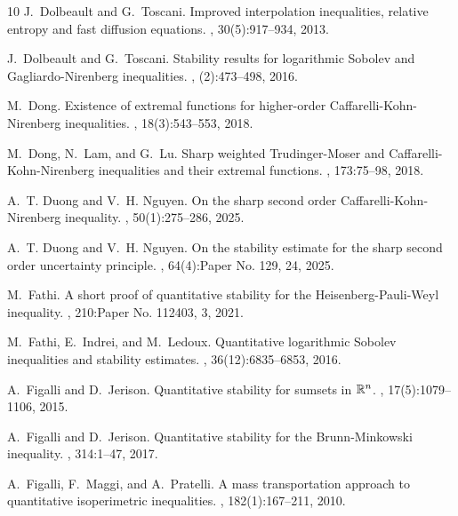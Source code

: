 \documentclass[a4paper,12pt]{article}
\theoremstyle{plain}
\theoremstyle{definition}
\theoremstyle{remark}
\numberwithin{equation}{section}
\begin{document}
\begin{thebibliography}{10}
J.~Dolbeault and G.~Toscani.
\newblock Improved interpolation inequalities, relative entropy and fast
  diffusion equations.
,
  30(5):917--934, 2013.

J.~Dolbeault and G.~Toscani.
\newblock Stability results for logarithmic {S}obolev and
  {G}agliardo-{N}irenberg inequalities.
, (2):473--498, 2016.

M.~Dong.
\newblock Existence of extremal functions for higher-order
  {C}affarelli-{K}ohn-{N}irenberg inequalities.
, 18(3):543--553, 2018.

M.~Dong, N.~Lam, and G.~Lu.
\newblock Sharp weighted {T}rudinger-{M}oser and
  {C}affarelli-{K}ohn-{N}irenberg inequalities and their extremal functions.
, 173:75--98, 2018.

A.~T. Duong and V.~H. Nguyen.
\newblock On the sharp second order {C}affarelli-{K}ohn-{N}irenberg inequality.
, 50(1):275--286, 2025.

A.~T. Duong and V.~H. Nguyen.
\newblock On the stability estimate for the sharp second order uncertainty
  principle.
, 64(4):Paper No. 129,
  24, 2025.

M.~Fathi.
\newblock A short proof of quantitative stability for the
  {H}eisenberg-{P}auli-{W}eyl inequality.
, 210:Paper No. 112403, 3, 2021.

M.~Fathi, E.~Indrei, and M.~Ledoux.
\newblock Quantitative logarithmic {S}obolev inequalities and stability
  estimates.
, 36(12):6835--6853, 2016.

A.~Figalli and D.~Jerison.
\newblock Quantitative stability for sumsets in {$\Bbb{R}^n$}.
, 17(5):1079--1106, 2015.

A.~Figalli and D.~Jerison.
\newblock Quantitative stability for the {B}runn-{M}inkowski inequality.
, 314:1--47, 2017.

A.~Figalli, F.~Maggi, and A.~Pratelli.
\newblock A mass transportation approach to quantitative isoperimetric
  inequalities.
, 182(1):167--211, 2010.


\end{thebibliography}
\end{document}

